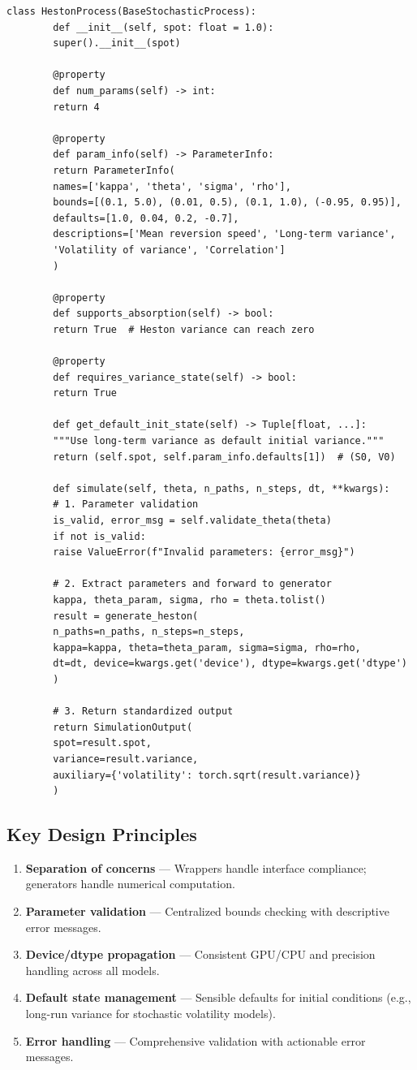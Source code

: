 	\begin{lstlisting}[style=cleanpy]
		class HestonProcess(BaseStochasticProcess):
		def __init__(self, spot: float = 1.0):
		super().__init__(spot)
		
		@property
		def num_params(self) -> int:
		return 4
		
		@property
		def param_info(self) -> ParameterInfo:
		return ParameterInfo(
		names=['kappa', 'theta', 'sigma', 'rho'],
		bounds=[(0.1, 5.0), (0.01, 0.5), (0.1, 1.0), (-0.95, 0.95)],
		defaults=[1.0, 0.04, 0.2, -0.7],
		descriptions=['Mean reversion speed', 'Long-term variance',
		'Volatility of variance', 'Correlation']
		)
		
		@property
		def supports_absorption(self) -> bool:
		return True  # Heston variance can reach zero
		
		@property
		def requires_variance_state(self) -> bool:
		return True
		
		def get_default_init_state(self) -> Tuple[float, ...]:
		"""Use long-term variance as default initial variance."""
		return (self.spot, self.param_info.defaults[1])  # (S0, V0)
		
		def simulate(self, theta, n_paths, n_steps, dt, **kwargs):
		# 1. Parameter validation
		is_valid, error_msg = self.validate_theta(theta)
		if not is_valid:
		raise ValueError(f"Invalid parameters: {error_msg}")
		
		# 2. Extract parameters and forward to generator
		kappa, theta_param, sigma, rho = theta.tolist()
		result = generate_heston(
		n_paths=n_paths, n_steps=n_steps,
		kappa=kappa, theta=theta_param, sigma=sigma, rho=rho,
		dt=dt, device=kwargs.get('device'), dtype=kwargs.get('dtype')
		)
		
		# 3. Return standardized output
		return SimulationOutput(
		spot=result.spot,
		variance=result.variance,
		auxiliary={'volatility': torch.sqrt(result.variance)}
		)
	\end{lstlisting}
	
	\subsection{Key Design Principles}
	\begin{enumerate}[leftmargin=*]
		\item \textbf{Separation of concerns} --- Wrappers handle interface compliance; generators handle numerical computation.
		\item \textbf{Parameter validation} --- Centralized bounds checking with descriptive error messages.
		\item \textbf{Device/dtype propagation} --- Consistent GPU/CPU and precision handling across all models.
		\item \textbf{Default state management} --- Sensible defaults for initial conditions (e.g., long-run variance for stochastic volatility models).
		\item \textbf{Error handling} --- Comprehensive validation with actionable error messages.
	\end{enumerate}
	

